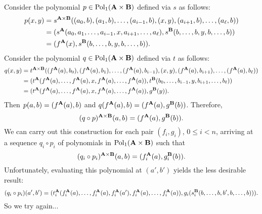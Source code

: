 Consider the polynomial $p \in \operatorname{Pol}_1(\mathbf{A}\times \mathbf{B})$ defined via
$s$ as follows:
\begin{align*}
p(x,y) &= s^{\mathbf{A} \times \mathbf{B}}((a_0, b), (a_1, b), \dots, (a_{i-1}, b),(x,y),
(a_{i+1}, b), \dots, (a_{\ell}, b))\\
&= (s^{\mathbf{A}} (a_0, a_1,\dots, a_{i-1}, x, a_{i+1}, \dots, a_{\ell}), 
s^{\mathbf{B}}(b, \dots, b, y, b,\dots, b))\\
&= (f^{\mathbf{A}} (x), 
s^{\mathbf{B}}(b, \dots, b, y, b,\dots, b)).
\end{align*}
Consider the polynomial $q \in \operatorname{Pol}_1(\mathbf{A}\times \mathbf{B})$ defined via
$t$ as follows:
\begin{align*}
q(x,y) &= t^{\mathbf{A} \times \mathbf{B}}((f^{\mathbf{A}}(a), b_0), (f^{\mathbf{A}}(a), b_1), \dots, (f^{\mathbf{A}}(a), b_{i-1}),(x,y),
(f^{\mathbf{A}}(a), b_{i+1}), \dots, (f^{\mathbf{A}}(a), b_{\ell}))\\
&= (t^{\mathbf{A}} (f^{\mathbf{A}}(a), \dots, f^{\mathbf{A}}(a), x, f^{\mathbf{A}}(a), \dots, f^{\mathbf{A}}(a)), 
t^{\mathbf{B}}(b_0, \dots, b_{i-1}, y, b_{i+1},\dots, b_{\ell}))\\
&= (t^{\mathbf{A}} (f^{\mathbf{A}}(a), \dots, f^{\mathbf{A}}(a), x, f^{\mathbf{A}}(a), \dots, f^{\mathbf{A}}(a)), 
g^{\mathbf{B}}(y)).
\end{align*}
Then $p(a,b) = (f^{\mathbf{A}}(a), b)$ and $q(f^{\mathbf{A}}(a), b) = (f^{\mathbf{A}}(a),g^{\mathbf{B}}(b))$.
Therefore,
\[
(q\circ p)^{\mathbf{A}\times \mathbf{B}} (a,b) =
(f^{\mathbf{A}} (a), g^{\mathbf{B}} (b)).
\]
We can carry out this construction for each pair $(f_i, g_i)$, $0\leq i < n$,
arriving at a sequence $q_i \circ p_i$ of polynomials in
$\operatorname{Pol}_1(\mathbf{A} \times \mathbf{B})$ such that
\[
(q_i\circ p_i)^{\mathbf{A}\times \mathbf{B}} (a,b) =
(f_i^{\mathbf{A}} (a), g_i^{\mathbf{B}} (b)).
\]
Unfortunately, evaluating this polynomial at $(a',b')$ yields the less
desirable result:
\[
(q_i\circ p_i)(a',b')=
(t_i^{\mathbf{A}}(f_i^{\mathbf{A}} (a), \dots, f_i^{\mathbf{A}} (a), f_i^{\mathbf{A}} (a'),f_i^{\mathbf{A}} (a), \dots, f_i^{\mathbf{A}} (a)),
g_i(s_i^{\mathbf{B}}(b, \dots, b, b', b,\dots, b))).
\]
So we try again...

